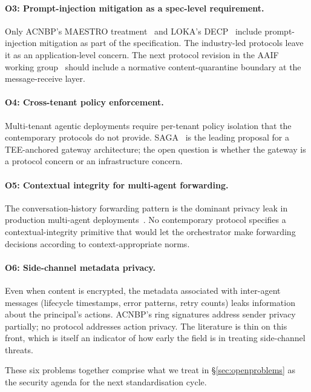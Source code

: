 \paragraph{O3: Prompt-injection mitigation as a
spec-level requirement.}
Only ACNBP's MAESTRO treatment~\cite{spec_acnbp} and
LOKA's DECP~\cite{spec_loka} include prompt-injection
mitigation as part of the specification. The
industry-led protocols leave it as an
application-level concern. The next protocol revision
in the AAIF working group~\cite{lf_aaif} should
include a normative content-quarantine boundary at the
message-receive layer.

\paragraph{O4: Cross-tenant policy enforcement.}
Multi-tenant agentic deployments require per-tenant
policy isolation that the contemporary protocols do not
provide. SAGA~\cite{saga2026} is the leading proposal
for a TEE-anchored gateway architecture; the open
question is whether the gateway is a protocol concern
or an infrastructure concern.

\paragraph{O5: Contextual integrity for
multi-agent forwarding.}
The conversation-history forwarding pattern is the
dominant privacy leak in production multi-agent
deployments~\cite{agentleak}. No contemporary protocol
specifies a contextual-integrity primitive that would
let the orchestrator make forwarding decisions
according to context-appropriate norms.

\paragraph{O6: Side-channel metadata privacy.}
Even when content is encrypted, the metadata associated
with inter-agent messages (lifecycle timestamps, error
patterns, retry counts) leaks information about the
principal's actions. ACNBP's ring signatures address
sender privacy partially; no protocol addresses
action privacy. The literature is thin on this front,
which is itself an indicator of how early the field
is in treating side-channel threats.

These six problems together comprise what we treat in
\S\ref{sec:openproblems} as the security agenda for the
next standardisation cycle.
